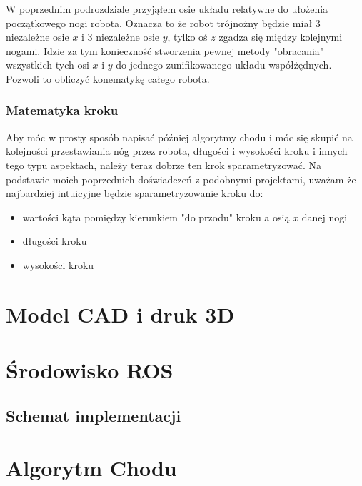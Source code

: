 \documentclass[a4paper,13pt]{article}
\begin{document}
W poprzednim podrozdziale przyjąłem osie układu relatywne do ułożenia początkowego nogi robota. Oznacza to że robot trójnożny będzie miał 3 niezależne osie $x$ i 3 niezależne osie $y$, tylko oś $z$ zgadza się między kolejnymi nogami. Idzie za tym konieczność stworzenia pewnej metody "obracania" wszystkich tych osi $x$ i $y$ do jednego zunifikowanego układu współżędnych. Pozwoli to obliczyć konematykę całego robota.

\subsubsection{Matematyka kroku}
Aby móc w prosty sposób napisać później algorytmy chodu i móc się skupić na kolejności przestawiania nóg przez robota, długości i wysokości kroku i innych tego typu aspektach, należy teraz dobrze ten krok sparametryzować. Na podstawie moich poprzednich doświadczeń z podobnymi projektami, uważam że najbardziej intuicyjne będzie sparametryzowanie kroku do:
\begin{itemize}
\item wartości kąta pomiędzy kierunkiem "do przodu" kroku a osią $x$ danej nogi
\item długości kroku
\item wysokości kroku
\end{itemize}



\section{Model CAD i druk 3D}

\section{Środowisko ROS}
\subsection{Schemat implementacji}

\section{Algorytm Chodu}
\end{document}
